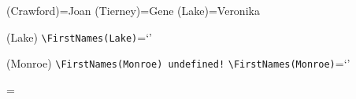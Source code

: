 \documentclass{article}
\newcommand{\BS}{\texttt{\symbol{`\\}}}
\begin{document}
\begin{Example}
  \makeatother

  \let\FirstNames\AssociativeArray
  \let\checkFirstNames\checkAssociativeArray
  \let\printFirstNames\printAssociativeArray

  \FirstNames(Crawford)={Joan}
  \FirstNames(Tierney)={Gene}
  \FirstNames(Lake)={Veronika}

  \printFirstNames

  \checkFirstNames(Lake)
  \verb+\FirstNames(Lake)+=`\cachedata'

  \checkFirstNames(Monroe)
  \ifemptydata
    \verb+\FirstNames(Monroe) undefined!+
  \else
    \verb+\FirstNames(Monroe)+=`\cachedata'
  \fi
\end{Example}

\makeatletter

\newarray\AssociativeArray@Names
\newarray\AssociativeArray@Values

\newcount\AssociativeArrayNbValues
\AssociativeArrayNbValues=\z@

\newif\ifAssociativeArray@ElementFound

\def\AssociativeArray(#1)=#2{%
\expandarrayelementtrue
\AssociativeArray@ElementFoundfalse
\edef\@tempa{#1}%
\Multido{\iValue=\@ne+\@ne}{\AssociativeArrayNbValues}{%
  \checkAssociativeArray@Names(\iValue)%
  \ifx\@tempa\cachedata
    \AssociativeArray@Values(\iValue)={#2}%
    \AssociativeArray@ElementFoundtrue
    \multidostop
  \fi}
\ifAssociativeArray@ElementFound
\else
  \advance\AssociativeArrayNbValues\@ne
  \AssociativeArray@Names(\AssociativeArrayNbValues)={#1}%
  \AssociativeArray@Values(\AssociativeArrayNbValues)={#2}%
\fi}

\def\checkAssociativeArray(#1){%
\edef\@tempa{#1}%
\edef\@tempb{999999}%
\Multido{\iValue=\@ne+\@ne}{\AssociativeArrayNbValues}{%
  \checkAssociativeArray@Names(\iValue)%
  \ifx\@tempa\cachedata
    \edef\@tempb{\iValue}%
    \multidostop
  \fi}
\checkAssociativeArray@Values(\@tempb)}

\def\printAssociativeArray{%
\multido{\iValue=\@ne+\@ne}{\AssociativeArrayNbValues}{%
  \checkAssociativeArray@Names(\iValue)%
  \iValue: \BS\texttt{FirstNames(\cachedata)}=`\AssociativeArray@Values(\iValue)'}}
\end{document}
